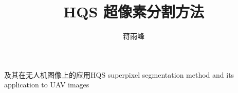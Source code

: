 \title{HQS 超像素分割方法}
{及其在无人机图像上的应用}{HQS superpixel segmentation method and its application to UAV images}
\author{蒋雨峰}
